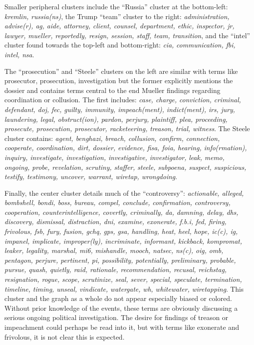 \documentclass[doublespacing]{utdthesis}
\begin{document}
Smaller peripheral clusters include the ``Russia'' cluster at the bottom-left: \emph{kremlin, russia(ns)}, the Trump ``team'' cluster to the right: \emph{administration, advise(r), ag, aide, attorney, client, counsel, department, ethic, inspector, jr, lawyer, mueller, reportedly, resign, session, staff, team, transition}, and the ``intel'' cluster found towards the top-left and bottom-right: \emph{cia, communication, fbi, intel, nsa}.

The ``prosecution'' and ``Steele'' clusters on the left are similar with terms like prosecutor, prosecution, investigation but the former explicitly mentions the dossier and contains terms central to the end Mueller findings regarding coordination or collusion.
The first includes: \emph{case, charge, conviction, criminal, defendant, doj, fec, guilty, immunity, impeach(ment), indict(ment), irs, jury, laundering, legal, obstruct(ion), pardon, perjury, plaintiff, plea, proceeding, prosecute, prosecution, prosecutor, racketeering, treason, trial, witness}.
The Steele cluster contains: \emph{agent, benghazi, breach, collusion, confirm, connection, cooperate, coordination, dirt, dossier, evidence, fisa, foia, hearing, info(rmation), inquiry, investigate, investigation, investigative, investigator, leak, memo, ongoing, probe, revelation, scrutiny, staffer, steele, subpoena, suspect, suspicious, testify, testimony, uncover, warrant, wiretap, wrongdoing}.

Finally, the center cluster details much of the ``controversy'': \emph{actionable, alleged, bombshell, bondi, boss, bureau, compel, conclude, confirmation, controversy, cooperation, counterintelligence, covertly, criminally, da, damning, delay, dhs, discovery, dismissal, distraction, dni, examine, exonerate, f.b.i, fed, firing, frivolous, fsb, fury, fusion, gchq, gps, gsa, handling, heat, heel, hope, ic(c), ig, impanel, implicate, improper(ly), incriminate, informant, kickback, kompromat, leaker, legality, marshal, mi6, mishandle, mooch, natsec, ns(c), oig, omb, pentagon, perjure, pertinent, pi, possibility, potentially, preliminary, probable, pursue, quash, quietly, raid, rationale, recommendation, recusal, reichstag, resignation, rogue, scope, scrutinize, seal, sever, special, speculate, termination, timeline, timing, unseal, vindicate, watergate, wh, whitewater, wiretapping}.
This cluster and the graph as a whole do not appear especially biased or colored.
Without prior knowledge of the events, these terms are obviously discussing a serious ongoing political investigation.
The desire for findings of treason or impeachment could perhaps be read into it, but with terms like exonerate and frivolous, it is not clear this is expected.
\end{document}
